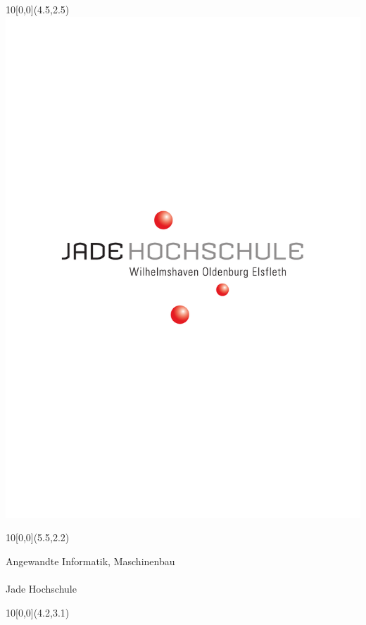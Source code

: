 \newcommand{\diameter}{20}
\newcommand{\xone}{-15}
\newcommand{\xtwo}{160}
\newcommand{\yone}{15}
\newcommand{\ytwo}{-253}




\begin{titlepage}



    \begin{textblock}{10}[0,0](4.5,2.5)
        \includegraphics[width=.25\textwidth]{include/Logo_JadeHochschule.pdf}
    \end{textblock}
    \begin{textblock}{10}[0,0](5.5,2.2)
        \begin{flushright}
            \Large Angewandte Informatik, Maschinenbau \\ \thesisinstitute \\ Jade Hochschule
        \end{flushright}
    \end{textblock}



    \begin{textblock}{10}[0,0](4.2,3.1)
    \end{textblock}




\end{titlepage}
